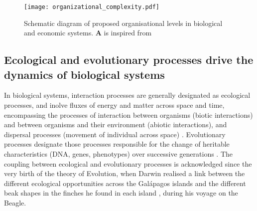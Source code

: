 \begin{figure}
    \centering
    \texttt{[image: organizational\_complexity.pdf]}
\caption{Schematic diagram of proposed organisational levels in biological and economic systems. \textbf{A} is inspired from \citep{Hendry+2016}}
\label{fig:organisational_levels}
\end{figure}





\subsection{Ecological and evolutionary processes drive the dynamics of biological systems}
% 
%
% 
In biological systems, interaction processes are generally designated as ecological processes, and inolve fluxes of energy and matter across space and time, encompassing the processes of interaction between organisms (biotic interactions) and between organisms and their environment (abiotic interactions), and dispersal processes (movement of individual across space) \citep{Vellend2010a}.
% 
Evolutionary processes designate those processes responsible for the change of heritable characteristics (DNA, genes, phenotypes) over successive generations \citep{Hall2013}.
% 
The coupling between ecological and evolutionary processes is acknowledged since the very birth of the theory of Evolution, when Darwin realised a link between the different ecological opportunities across the Galápagos islands and the different beak shapes in the finches he found in each island \citep{darwin2004origin}, during his voyage on the Beagle.
